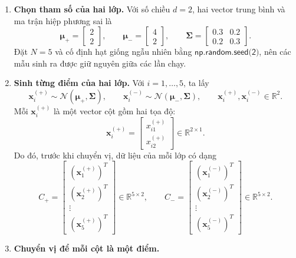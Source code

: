 \begin{enumerate}
  \item \textbf{Chọn tham số của hai lớp.} Với số chiều \(d=2\), hai vector trung bình và ma trận hiệp phương sai là
  \[
  \boldsymbol{\mu}_{+}=\begin{bmatrix}2\\2\end{bmatrix},
  \qquad
  \boldsymbol{\mu}_{-}=\begin{bmatrix}4\\2\end{bmatrix},
  \qquad
  \boldsymbol{\Sigma}=\begin{bmatrix}
  0.3 & 0.2\\
  0.2 & 0.3
  \end{bmatrix}.
  \]
  Đặt \(N=5\) và cố định hạt giống ngẫu nhiên bằng
  \(\textsf{np.random.seed(2)}\), nên các mẫu sinh ra được giữ nguyên giữa các lần chạy.

  \item \textbf{Sinh từng điểm của hai lớp.} Với \(i=1,\ldots,5\), ta lấy
  \[
  \mathbf{x}_i^{(+)}\sim\mathcal{N}(\boldsymbol{\mu}_{+},\boldsymbol{\Sigma}),
  \qquad
  \mathbf{x}_i^{(-)}\sim\mathcal{N}(\boldsymbol{\mu}_{-},\boldsymbol{\Sigma}),
  \qquad
  \mathbf{x}_i^{(+)},\mathbf{x}_i^{(-)}\in\mathbb{R}^{2}.
  \]
  Mỗi \(\mathbf{x}_i^{(+)}\) là một vector cột gồm hai tọa độ:
  \[
  \mathbf{x}_i^{(+)}
  =
  \begin{bmatrix}
  x_{i1}^{(+)}\\
  x_{i2}^{(+)}
  \end{bmatrix}
  \in\mathbb{R}^{2\times 1}.
  \]
  Do đó, trước khi chuyển vị, dữ liệu của mỗi lớp có dạng
  \[
  C_{+}=
  \begin{bmatrix}
  (\mathbf{x}_1^{(+)})^{T}\\
  (\mathbf{x}_2^{(+)})^{T}\\
  \vdots\\
  (\mathbf{x}_5^{(+)})^{T}
  \end{bmatrix}\in\mathbb{R}^{5\times 2},
  \qquad
  C_{-}=
  \begin{bmatrix}
  (\mathbf{x}_1^{(-)})^{T}\\
  (\mathbf{x}_2^{(-)})^{T}\\
  \vdots\\
  (\mathbf{x}_5^{(-)})^{T}
  \end{bmatrix}\in\mathbb{R}^{5\times 2}.
  \]

  \item \textbf{Chuyển vị để mỗi cột là một điểm.}
  

\end{enumerate}
